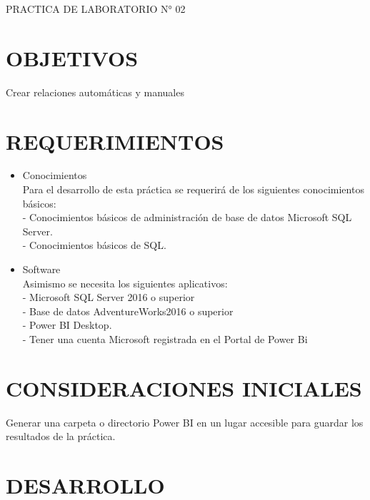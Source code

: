 \begin{center}
    PRACTICA DE LABORATORIO N° 02
\end{center}

\section{OBJETIVOS}
Crear relaciones automáticas y manuales

\section{REQUERIMIENTOS}

\begin{itemize}

\item Conocimientos
\\Para el desarrollo de esta práctica se requerirá de los siguientes conocimientos básicos:
\\- Conocimientos básicos de administración de base de datos Microsoft SQL Server.
\\- Conocimientos básicos de SQL.
\item Software
\\Asimismo se necesita los siguientes aplicativos:
\\- Microsoft SQL Server 2016 o superior
\\- Base de datos AdventureWorks2016 o superior
\\- Power BI Desktop.
\\- Tener una cuenta Microsoft registrada en el Portal de Power Bi
\end{itemize}

\section{CONSIDERACIONES INICIALES}
\item Generar una carpeta o directorio Power BI en un lugar accesible para guardar los resultados de la práctica.

\section{DESARROLLO} 

